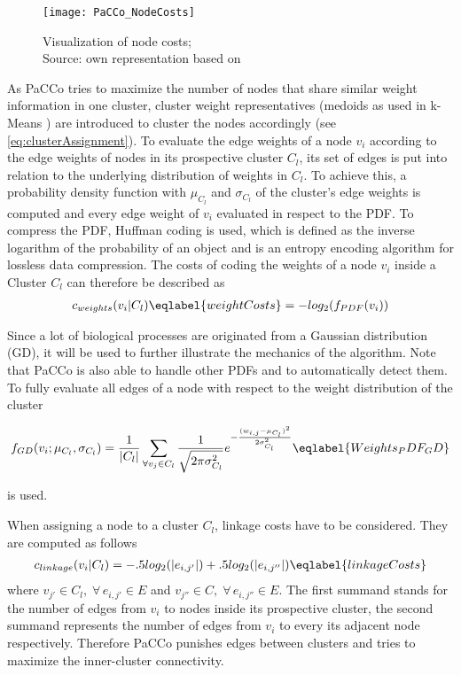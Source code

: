 \documentclass[12pt,journal,compsoc]{IEEEtran}
\numberwithin{equation}{section}
\begin{document}
	\begin{figure}[h]
		\centering
		\texttt{[image: PaCCo\_NodeCosts]}
		\caption{Visualization of node costs; \\Source: own representation based on \cite{mueller2011weighted}}
		\label{fig:nodeCosts}
	\end{figure}

As PaCCo tries to maximize the number of nodes that share similar weight information in one cluster, cluster weight representatives (medoids as used in k-Means \cite{Runkler2010DataAnalytics}) are introduced to cluster the nodes accordingly (see \eqref{eq:clusterAssignment}). 
To evaluate the edge weights of a node $ v_{i} $ according to the edge weights of nodes in its prospective cluster $ C_{l} $, its set of edges is put into relation to the underlying distribution of weights in $ C_{l} $. To achieve this, a probability density function with  $ \mu_{C_{l}} $ and $ \sigma_{C_{l}} $ of the cluster's edge weights is computed and every edge weight of $ v_{i} $ evaluated in respect to the PDF. To compress the PDF, Huffman coding is used, which is defined as the inverse logarithm of the probability of an object and is an entropy encoding algorithm for lossless data compression. The costs of coding the weights of a node $ v_{i} $ inside a Cluster $ C_{l} $ can therefore be described as
\begin{align}
	c_{weights}(v_{i}|C_{l})
	\eqlabel{weightCosts}=-log_{2}(f_{PDF}(v_{i}))
\end{align}

Since a lot of biological processes are originated from a Gaussian distribution (GD), it will be used to further illustrate the mechanics of the algorithm. Note that PaCCo is also able to handle other PDFs and to automatically detect them.
To fully evaluate all edges of a node with respect to the weight distribution of the cluster

	\begin{align}		
		f_{GD}(v_{i};\mu_{C_{l}},\sigma_{C_{l}}) = \frac{1}{|C_{l}|} \sum_{\forall v_{j} \in C_{l}} \frac{1}{\sqrt{2 \pi \sigma_{C_{l}}^{2}}}e^{-{\frac{(w_{i,j}-\mu_{C_{l}})^{2}}{2 \sigma_{C_{l}}^{2} }}}
		\eqlabel{Weights_PDF_GD}
	\end{align}

is used. 

When assigning a node to a cluster $ C_{l} $, linkage costs have to be considered. They are computed as follows 
	\begin{align}
		c_{linkage}(v_{i}|C_{l})=-.5log_{2}(|e_{i,j'}|)+.5log_{2}(|e_{i,j''}|)
		\eqlabel{linkageCosts}
	\end{align}
where $ v_{j'} \in C_{l}, \; \forall\, e_{i,j'} \in E $ and ${ v_{j''} \in C, \; \forall\, e_{i,j''} \in E }$.
The first summand stands for the number of edges from $ v_{i} $ to nodes inside its prospective cluster, the second summand represents the number of edges from $ v_{i} $ to every its adjacent node respectively. 
Therefore PaCCo punishes edges between clusters and tries to maximize the inner-cluster connectivity.
\end{document}
